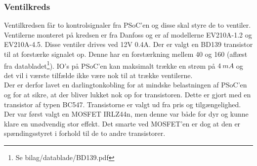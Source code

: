 \subsubsection{Ventilkreds}
Ventilkredsen får to kontrolsignaler fra PSoC'en og disse skal styre de to ventiler. Ventilerne monteret på kredsen er fra Danfoss og er af modellerne EV210A-1.2 og EV210A-4.5. Disse ventiler drives ved 12V 0.4A. Der er valgt en BD139 transistor til at forstærke signalet op. Denne har en forstærkning mellem 40 og 160 (aflæst fra databladet\footnote{Se bilag/datablade/BD139.pdf}). IO's på PSoC'en kan maksimalt trække en strøm på $\SI{4}{mA}$ og det vil i værste tilfælde ikke være nok til at trække ventilerne.\\
Der er derfor lavet en darlingtonkobling for at mindske belastningen af PSoC'en og for at sikre, at der bliver lukket nok op for transistoren. Dette er gjort med en transistor af typen BC547. Transistorne er valgt ud fra pris og tilgængelighed. Der var først valgt en MOSFET IRLZ44n, men denne var både for dyr og kunne klare en unødvendig stor effekt. Det smarte ved MOSFET'en er dog at den er spændingsstyret i forhold til de to andre transistorer. 


